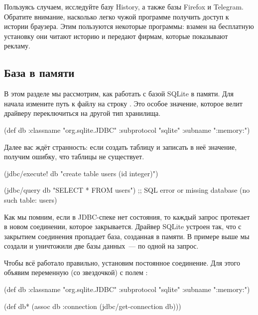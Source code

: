 Пользуясь случаем, исследуйте базу History, а также базы Firefox и Telegram. Обратите внимание, насколько легко чужой программе получить доступ к истории браузера. Этим пользуются некоторые программы: взамен на бесплатную установку они читают историю и передают фирмам, которые показывают рекламу.

\subsection{База в памяти}

В этом разделе мы рассмотрим, как работать с базой SQLite в памяти. Для начала измените путь к файлу на строку . Это особое значение, которое велит драйверу переключиться на другой тип хранилища.


\begin{english}
  \begin{clojure}
(def db
  {:classname   "org.sqlite.JDBC"
   :subprotocol "sqlite"
   :subname     ":memory:"})
  \end{clojure}
\end{english}

Далее вас ждёт странность: если создать таблицу и записать в неё значение, получим ошибку, что таблицы не существует.

\begin{english}
  \begin{clojure}
(jdbc/execute! db "create table users (id integer)")

(jdbc/query db "SELECT * FROM users")
;; SQL error or missing database (no such table: users)
  \end{clojure}
\end{english}

Как мы помним, если в JDBC-спеке нет состояния, то каждый запрос протекает в новом соединении, которое закрывается. Драйвер SQLite устроен так, что с закрытием соединения пропадает база, созданная в памяти. В примере выше мы создали и уничтожили две базы данных~--- по одной на запрос.

Чтобы всё работало правильно, установим постоянное соединение. Для этого объявим переменную  (со звездочкой) с полем :

\begin{english}
  \begin{clojure}
(def db
  {:classname   "org.sqlite.JDBC"
   :subprotocol "sqlite"
   :subname     ":memory:"})

(def db*
  (assoc db :connection
         (jdbc/get-connection db)))
  \end{clojure}
\end{english}

